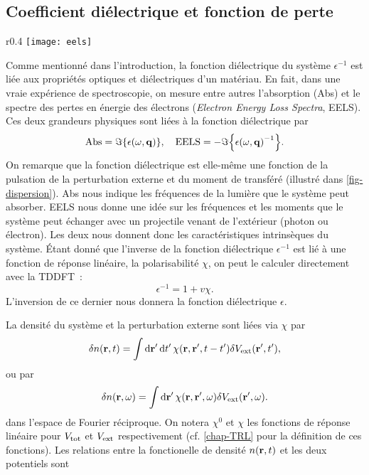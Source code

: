 \subsection{Coefficient diélectrique et fonction de perte}
\label{subsec-eels}
\begin{wrapfigure}{r}{0.4\textwidth}
  \centering
  \texttt{[image: eels]}
  \caption{Dispersion et moment transféré}\label{fig-dispersion}
\end{wrapfigure}
Comme mentionné dans l'introduction,
la fonction diélectrique du système $\epsilon^{-1}$ est liée aux propriétés optiques et diélectriques d'un matériau.
En fait, dans une vraie expérience de spectroscopie,
on mesure entre autres l'absorption (Abs) et le spectre des pertes en énergie des électrons
(\textit{Electron Energy Loss Spectra}, EELS).
Ces deux grandeurs physiques sont liées à la fonction diélectrique par~\cite{Sottile2003}
\begin{equation}
  \label{eqn-EELS}
  \V{Abs} = \imaginary\qty{\epsilon(\omega, \vb{q})},
  \quad
  \V{EELS} = -\imaginary\qty{{\epsilon(\omega, \vb{q})}^{-1}}.
\end{equation}
On remarque que la fonction diélectrique est elle-même une fonction de la pulsation de la perturbation externe et du moment de transféré (illustré dans \cref{fig-dispersion}).
Abs nous indique les fréquences de la lumière que le système peut absorber.
EELS nous donne une idée sur les fréquences et les moments
que le système peut échanger avec un projectile venant de l'extérieur (photon ou électron).
Les deux nous donnent donc les caractéristiques intrinsèques du système.
Étant donné que l'inverse de la fonction diélectrique
$\epsilon^{-1}$ est lié à une fonction de réponse linéaire,
la polarisabilité $\chi$, on peut le calculer directement
avec la TDDFT~\cite{Martin2004, Sottile2003}:
\begin{equation}
  \label{epsilon}
  \epsilon^{-1} = 1+ v\chi.
\end{equation}
L'inversion de ce dernier nous donnera la fonction diélectrique $\epsilon$.

La densité du système et la perturbation externe sont liées via $\chi$ par
\begin{equation}
  \delta n(\vb{r}, t) = \int \dd{\vb{r}'} \dd{t'} \chi(\vb{r}, \vb{r}', t-t')\delta V_{\textnormal{ext}}(\vb{r}', t'),
\end{equation}
ou par
\begin{equation}
  \delta n(\vb{r}, \omega) = \int\dd{\vb{r}'}\chi(\vb{r}, \vb{r}', \omega)\delta V_{\textnormal{ext}}(\vb{r}', \omega).
\end{equation}
dans l'espace de Fourier réciproque.
On notera $\chi^0$ et $\chi$ les fonctions de réponse linéaire pour
$V_{\textnormal{tot}}$ et $V_{\textnormal{ext}}$ respectivement (cf. \cref{chap-TRL} pour la définition de ces fonctions).
Les relations entre la fonctionelle de densité $n(\vb{r}, t)$ et les deux potentiels sont

